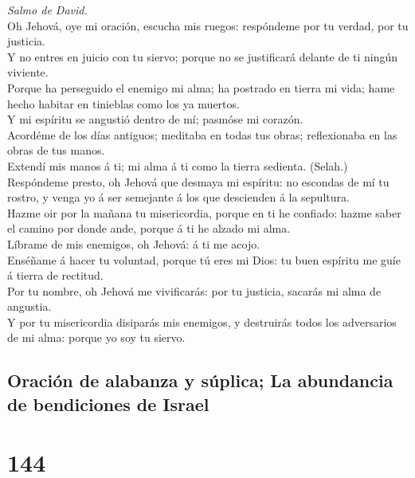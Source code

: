  \emph{Salmo de David.}\\
Oh Jehová, oye mi oración, escucha mis ruegos: respóndeme por tu verdad,
por tu justicia.\\
 Y no entres en juicio con tu siervo; porque no se
justificará delante de ti ningún viviente.\\
 Porque ha perseguido el enemigo mi alma; ha postrado en
tierra mi vida; hame hecho habitar en tinieblas como los ya muertos.\\
 Y mi espíritu se angustió dentro de mí; pasmóse mi
corazón.\\
 Acordéme de los días antiguos; meditaba en todas tus obras;
reflexionaba en las obras de tus manos.\\
 Extendí mis manos á ti; mi alma á ti como la tierra
sedienta. (Selah.)\\
 Respóndeme presto, oh Jehová que desmaya mi espíritu: no
escondas de mí tu rostro, y venga yo á ser semejante á los que
descienden á la sepultura.\\
 Hazme oir por la mañana tu misericordia, porque en ti he
confiado: hazme saber el camino por donde ande, porque á ti he alzado mi
alma.\\
 Líbrame de mis enemigos, oh Jehová: á ti me acojo.\\
 Enséñame á hacer tu voluntad, porque tú eres mi Dios: tu
buen espíritu me guíe á tierra de rectitud.\\
 Por tu nombre, oh Jehová me vivificarás: por tu justicia,
sacarás mi alma de angustia.\\
 Y por tu misericordia disiparás mis enemigos, y destruirás
todos los adversarios de mi alma: porque yo soy tu siervo.

\hypertarget{oraciuxf3n-de-alabanza-y-suxfaplica-la-abundancia-de-bendiciones-de-israel}{%
\subsection{Oración de alabanza y súplica; La abundancia de bendiciones
de
Israel}\label{oraciuxf3n-de-alabanza-y-suxfaplica-la-abundancia-de-bendiciones-de-israel}}

\hypertarget{section-143}{%
\section{144}\label{section-143}}

